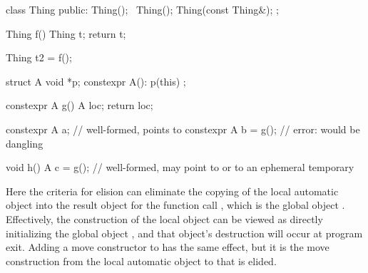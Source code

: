\pnum
\begin{example}
\begin{codeblock}
class Thing {
public:
  Thing();
  ~Thing();
  Thing(const Thing&);
};

Thing f() {
  Thing t;
  return t;
}

Thing t2 = f();

struct A {
  void *p;
  constexpr A(): p(this) {}
};

constexpr A g() {
  A loc;
  return loc;
}

constexpr A a;          // well-formed,  points to 
constexpr A b = g();    // error:  would be dangling

void h() {
  A c = g();            // well-formed,  may point to  or to an ephemeral temporary
}
\end{codeblock}
Here the criteria for elision can
eliminate
the copying of the local automatic object
into the result object for the function call
,
which is the global object
.
Effectively, the construction of the local object
can be viewed as directly initializing the global
object
,
and that object's destruction will occur at program
exit.
Adding a move constructor to  has the same effect, but it is the
move construction from the local automatic object to  that is elided.
\end{example}

